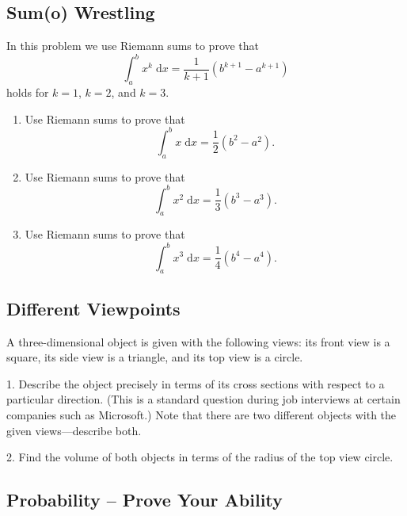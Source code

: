 \documentclass[12pt]{article}
\begin{document}
\subsection{Sum(o) Wrestling} 



\vspace*{.2in}


\noindent In this problem we use Riemann sums to prove that $$\int_{a}^b x^k \; \mathrm{d}x = \frac{1}{k+1}(b^{k+1}-a^{k+1})$$ holds for $k=1$, $k=2$, and $k=3$.

\begin{enumerate}

\item Use Riemann sums to prove that $$\int_{a}^b x \; \mathrm{d}x = \frac{1}{2}(b^{2}-a^{2}).$$

\item Use Riemann sums to prove that $$\int_{a}^b x^2 \; \mathrm{d}x = \frac{1}{3}(b^{3}-a^{3}).$$

\item Use Riemann sums to prove that $$\int_{a}^b x^3 \; \mathrm{d}x = \frac{1}{4}(b^{4}-a^{4}).$$

\end{enumerate}



\subsection{Different Viewpoints} 



\vspace*{.2in}


\noindent  
A three-dimensional object is given with the following views: its front view is a square, its side view is a triangle, and its top view is a circle.

1.  Describe the object precisely in terms of its cross sections with respect to a particular direction.  (This is a standard question during job interviews at certain companies such as Microsoft.)  Note that there are two different objects with the given views---describe both.

2.  Find the volume of both objects in terms of the radius of the top view circle.





\subsection{Probability -- Prove Your Ability} 
\end{document}
